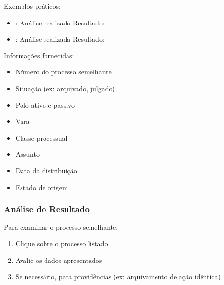 \documentclass[letterpaper,10pt,brazil]{sphinxmanual}
\begin{document}
\sphinxAtStartPar
Exemplos práticos:
\begin{itemize}
\item {} 
\sphinxAtStartPar
{}:
\sphinxhyphen{} Análise realizada
\sphinxhyphen{} Resultado: 

\item {} 
\sphinxAtStartPar
{}:
\sphinxhyphen{} Análise realizada
\sphinxhyphen{} Resultado: 

\end{itemize}

\sphinxAtStartPar
Informações fornecidas:
\begin{itemize}
\item {} 
\sphinxAtStartPar
Número do processo semelhante

\item {} 
\sphinxAtStartPar
Situação (ex: arquivado, julgado)

\item {} 
\sphinxAtStartPar
Polo ativo e passivo

\item {} 
\sphinxAtStartPar
Vara

\item {} 
\sphinxAtStartPar
Classe processual

\item {} 
\sphinxAtStartPar
Assunto

\item {} 
\sphinxAtStartPar
Data da distribuição

\item {} 
\sphinxAtStartPar
Estado de origem

\end{itemize}


\subsubsection{Análise do Resultado}
\label{\detokenize{projud_14_iaarandu:analise-do-resultado}}
\sphinxAtStartPar
Para examinar o processo semelhante:
\begin{enumerate}
%
\item {} 
\sphinxAtStartPar
Clique sobre o processo listado

\item {} 
\sphinxAtStartPar
Avalie os dados apresentados

\item {} 
\sphinxAtStartPar
Se necessário,  para providências (ex: arquivamento de ação idêntica)

\end{enumerate}
\end{document}
